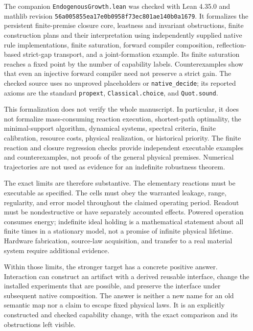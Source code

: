 \documentclass[11pt]{article}
\theoremstyle{definition}
\theoremstyle{remark}
\begin{document}
The companion \texttt{EndogenousGrowth.lean} was checked with Lean 4.35.0
and mathlib revision
\texttt{56a005855ea17e0b0958f73ec801ae140b0a1679}.
It formalizes the persistent finite-premise closure core, leastness and
invariant obstructions, finite construction plans and their interpretation
using independently supplied native rule implementations, finite
saturation, forward compiler composition, reflection-based strict-gap
transport, and a joint-formation example. Its finite saturation reaches
a fixed point by the number of capability labels. Counterexamples show
that even an injective forward compiler need not preserve a strict gain.
The checked source uses no unproved placeholders or \texttt{native\_decide};
its reported axioms are the standard
\texttt{propext}, \texttt{Classical.choice}, and \texttt{Quot.sound}.

This formalization does not verify the whole manuscript. In particular,
it does not formalize mass-consuming reaction execution, shortest-path
optimality, the minimal-support algorithm, dynamical systems, spectral
criteria, finite calibration, resource costs, physical realization, or
historical priority. The finite reaction and closure regression checks
provide independent executable examples and counterexamples, not proofs
of the general physical premises. Numerical trajectories are not used
as evidence for an indefinite robustness theorem.

The exact limits are therefore substantive. The elementary reactions must
be executable as specified. The cells must obey the warranted leakage,
range, regularity, and error model throughout the claimed operating
period. Readout must be nondestructive or have separately accounted
effects. Powered operation consumes energy; indefinite ideal holding is
a mathematical statement about all finite times in a stationary model,
not a promise of infinite physical lifetime. Hardware fabrication,
source-law acquisition, and transfer to a real material system require
additional evidence.

Within those limits, the stronger target has a concrete positive answer.
Interaction can construct an artifact with a derived reusable interface,
change the installed experiments that are possible, and preserve the
interface under subsequent native composition. The answer is neither a
new name for an old semantic map nor a claim to escape fixed physical
laws. It is an explicitly constructed and checked capability change,
with the exact comparison and its obstructions left visible.
\end{document}
